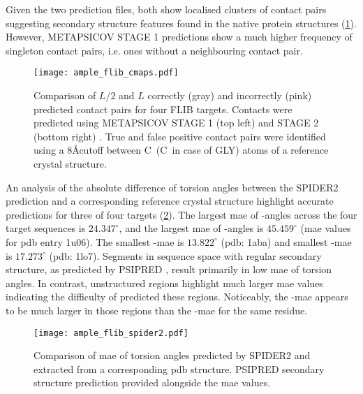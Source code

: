 Given the two prediction files, both show localised clusters of contact pairs suggesting
 secondary structure features found in the native protein structures (\cref{fig:ample_flib_cmaps}). However, METAPSICOV STAGE 1 predictions show a much higher frequency of singleton contact pairs, i.e. ones without a neighbouring contact pair.

\begin{figure}[H]
	\centering
	\texttt{[image: ample\_flib\_cmaps.pdf]}
	\caption[Contact map comparison for FLIB targets]{Comparison of $L/2$ and $L$ correctly (gray) and incorrectly (pink) predicted contact pairs for four FLIB targets. Contacts were predicted using METAPSICOV STAGE 1 (top left) and STAGE 2 (bottom right) \cite{Jones2015-wp}. True and false positive contact pairs were identified using a 8\AA cutoff between C\textalpha\ (C\textbeta\ in case of GLY) atoms of a reference crystal structure.}
	\label{fig:ample_flib_cmaps}
\end{figure}

An analysis of the absolute difference of torsion angles between the SPIDER2 \cite{Heffernan2015-wp} prediction and a corresponding reference crystal structure highlight accurate predictions for three of four targets (\cref{fig:ample_flib_spider2}). The largest \gls{mae} of \textphi-angles across the four target sequences is $24.347^{\circ}$, and the largest \gls{mae} of \textpsi-angles is $45.459^{\circ}$ (\gls{mae} values for \gls{pdb} entry 1u06). The smallest \textphi-\gls{mae} is $13.822^{\circ}$ (\gls{pdb}: 1aba) and smallest \textpsi-\gls{mae} is $17.273^{\circ}$ (\gls{pdb}: 1lo7). Segments in sequence space with regular secondary structure, as predicted by PSIPRED \cite{Jones1999-fi}, result primarily in low \gls{mae} of torsion angles. In contrast, unstructured regions highlight much larger \gls{mae} values indicating the difficulty of predicted these regions. Noticeably, the \textpsi-\gls{mae} appears to be much larger in those regions than the \textphi-\gls{mae} for the same residue.

\begin{figure}[H]
	\centering
	\texttt{[image: ample\_flib\_spider2.pdf]}
	\caption[SPIDER2 torsion angle prediction analysis of FLIB targets]{Comparison of \gls{mae} of torsion angles predicted by SPIDER2 and extracted from a corresponding \gls{pdb} structure. PSIPRED \cite{Jones1999-fi} secondary structure prediction provided alongside the \gls{mae} values.}
	\label{fig:ample_flib_spider2}
\end{figure}

